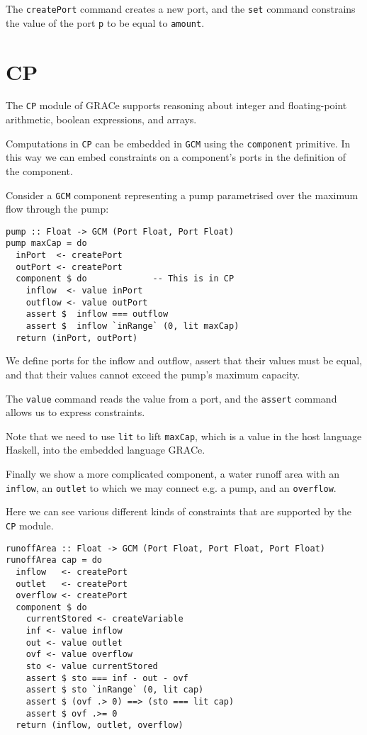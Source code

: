 \documentclass[a4paper,11pt]{article}
\begin{document}
The \texttt{createPort} command creates a new port, and the \texttt{set} command
constrains the value of the port \texttt{p} to be equal to \texttt{amount}.

\section{CP}
The \texttt{CP} module of GRACe supports reasoning about integer and floating-point arithmetic,
boolean expressions, and arrays.

Computations in \texttt{CP} can be embedded in \texttt{GCM} using the
\texttt{component} primitive. In this way we can embed constraints on a
component's ports in the definition of the component.

Consider a \texttt{GCM} component representing a pump
parametrised over the maximum flow through the pump:
%
\begin{verbatim}
pump :: Float -> GCM (Port Float, Port Float)
pump maxCap = do
  inPort  <- createPort
  outPort <- createPort
  component $ do             -- This is in CP
    inflow  <- value inPort
    outflow <- value outPort
    assert $  inflow === outflow
    assert $  inflow `inRange` (0, lit maxCap)
  return (inPort, outPort)
\end{verbatim}
We define ports for the inflow and outflow, assert that their values must
be equal, and that their values cannot exceed the pump's maximum capacity.

The \texttt{value} command reads the value from a port,
and the \texttt{assert} command allows us to express constraints.

Note that we need to use \texttt{lit} to lift \texttt{maxCap}, which
is a value in the host language Haskell, into the embedded language
GRACe.

Finally we show a more complicated component, a water runoff area with
an \texttt{inflow}, an \texttt{outlet} to which we may connect e.g. a pump,
and an \texttt{overflow}.

Here we can see various different kinds of constraints
that are supported by the \texttt{CP} module.
\begin{verbatim}
runoffArea :: Float -> GCM (Port Float, Port Float, Port Float)
runoffArea cap = do
  inflow   <- createPort
  outlet   <- createPort
  overflow <- createPort
  component $ do
    currentStored <- createVariable
    inf <- value inflow
    out <- value outlet
    ovf <- value overflow
    sto <- value currentStored
    assert $ sto === inf - out - ovf
    assert $ sto `inRange` (0, lit cap)
    assert $ (ovf .> 0) ==> (sto === lit cap)
    assert $ ovf .>= 0
  return (inflow, outlet, overflow)
\end{verbatim}
\end{document}
